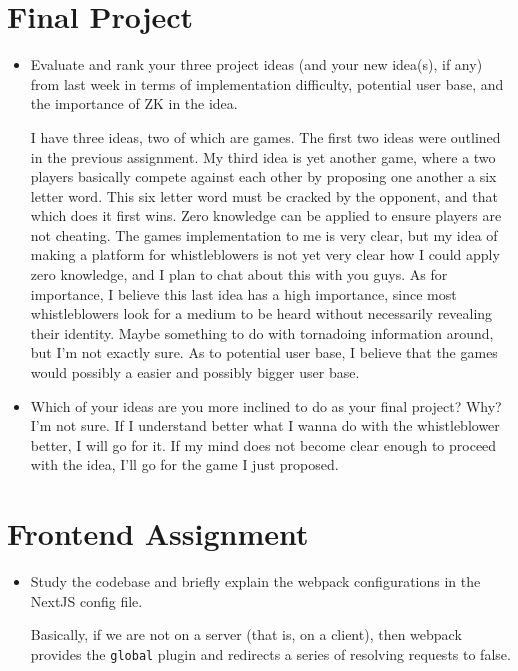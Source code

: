\documentclass{article}
\begin{document}
\section*{Final Project}
\begin{itemize}
    \item Evaluate and rank your three project ideas (and your new idea(s), if any) from last week in terms of implementation difficulty, potential user base, and the importance of ZK in the idea. \par I have three ideas, two of which are games. The first two ideas were outlined in the previous assignment. My third idea is yet another game, where a two players basically compete against each other by proposing one another a six letter word. This six letter word must be cracked by the opponent, and that which does it first wins. Zero knowledge can be applied to ensure players are not cheating. The games implementation to me is very clear, but my idea of making a platform for whistleblowers is not yet very clear how I could apply zero knowledge, and I plan to chat about this with you guys. As for importance, I believe this last idea has a high importance, since most whistleblowers look for a medium to be heard without necessarily revealing their identity. Maybe something to do with tornadoing information around, but I'm not exactly sure. As to potential user base, I believe that the games would possibly a easier and possibly bigger user base.
    \item Which of your ideas are you more inclined to do as your final project? Why? I'm not sure. If I understand better what I wanna do with the whistleblower better, I will go for it. If my mind does not become clear enough to proceed with the idea, I'll go for the game I just proposed.
\end{itemize}

\section*{Frontend Assignment}
\begin{itemize}
    \item Study the codebase and briefly explain the webpack configurations in the NextJS config file. \par Basically, if we are not on a server (that is, on a client), then webpack provides the \texttt{global} plugin and redirects a series of resolving requests to false.
\end{itemize}
\end{document}
